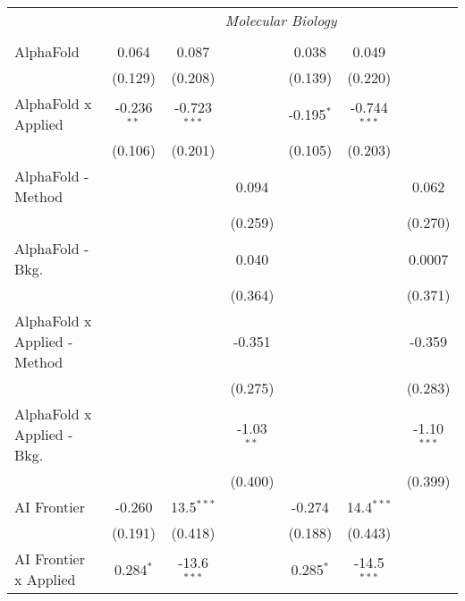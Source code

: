 \begin{tabular}{lcccccc}
 & \multicolumn{6}{c}{\textit{Molecular Biology}} \\ \\
   AlphaFold                      & 0.064         & 0.087          &               & 0.038        & 0.049          &   \\   
                                  & (0.129)       & (0.208)        &               & (0.139)      & (0.220)        &   \\   
   AlphaFold x Applied            & -0.236$^{**}$ & -0.723$^{***}$ &               & -0.195$^{*}$ & -0.744$^{***}$ &   \\   
                                  & (0.106)       & (0.201)        &               & (0.105)      & (0.203)        &   \\   
   AlphaFold - Method             &               &                & 0.094         &              &                & 0.062\\   
                                  &               &                & (0.259)       &              &                & (0.270)\\   
   AlphaFold - Bkg.               &               &                & 0.040         &              &                & 0.0007\\   
                                  &               &                & (0.364)       &              &                & (0.371)\\   
   AlphaFold x Applied - Method   &               &                & -0.351        &              &                & -0.359\\   
                                  &               &                & (0.275)       &              &                & (0.283)\\   
   AlphaFold x Applied - Bkg.     &               &                & -1.03$^{**}$  &              &                & -1.10$^{***}$\\   
                                  &               &                & (0.400)       &              &                & (0.399)\\   
   AI Frontier                    & -0.260        & 13.5$^{***}$   &               & -0.274       & 14.4$^{***}$   &   \\   
                                  & (0.191)       & (0.418)        &               & (0.188)      & (0.443)        &   \\   
   AI Frontier x Applied          & 0.284$^{*}$   & -13.6$^{***}$  &               & 0.285$^{*}$  & -14.5$^{***}$  &   \\   

\end{tabular}
